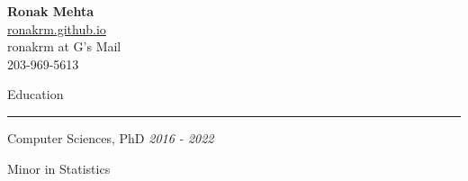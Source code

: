 \documentclass[]{article}
\title{}
\author{}
\date{}
\begin{document}
\begin{center}
	{\Huge\bf Ronak Mehta} \\
	\vspace{5pt}
	{\large%
	\url{ronakrm.github.io} \\
	ronakrm at G's Mail \\
	203-969-5613 \\ }
\end{center}



\vspace{10pt}
{\LARGE Education}
\vspace{3pt}
\hrule
\vspace{10pt}


	{Computer Sciences, PhD \hfill \textit{2016 - 2022}} 
	
	\qquad Minor in Statistics
		
\end{document}
